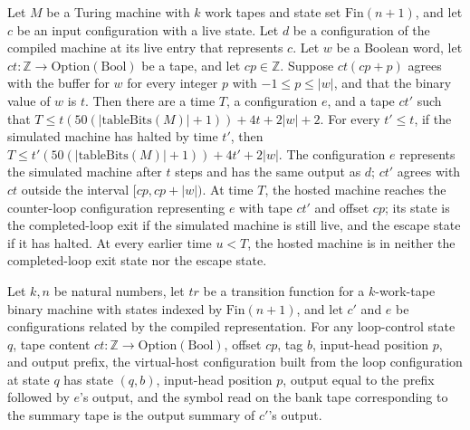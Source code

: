 \begin{theorem}
\label{Turing.StepBlock.hostedLoopTM_run}
\leanok
{}
Let $M$ be a Turing machine with $k$ work tapes and state set $\mathrm{Fin}(n+1)$, and
let $c$ be an input configuration with a live state. Let $d$ be a configuration of the
compiled machine at its live entry that represents $c$. Let $w$ be a Boolean word, let
$ct:\mathbb{Z}\to\mathrm{Option}(\mathrm{Bool})$ be a tape, and let $cp\in\mathbb{Z}$.
Suppose $ct(cp+p)$ agrees with the buffer for $w$ for every integer $p$ with
$-1\le p\le |w|$, and that the binary value of $w$ is $t$. Then there are a time $T$, a
configuration $e$, and a tape $ct\prime$ such that
$T\le t(50(|\mathrm{tableBits}(M)|+1))+4t+2|w|+2$. For every $t\prime\le t$, if the
simulated machine has halted by time $t\prime$, then
$T\le t\prime(50(|\mathrm{tableBits}(M)|+1))+4t\prime+2|w|$. The configuration $e$
represents the simulated machine after $t$ steps and has the same output as $d$; $ct\prime$
agrees with $ct$ outside the interval $[cp,cp+|w|)$. At time $T$, the hosted machine
reaches the counter-loop configuration representing $e$ with tape $ct\prime$ and offset
$cp$; its state is the completed-loop exit if the simulated machine is still live, and the
escape state if it has halted. At every earlier time $u<T$, the hosted machine is in
neither the completed-loop exit state nor the escape state.
\end{theorem}

\begin{theorem}
\label{Turing.StepBlock.hostedLoop_read}
\leanok
{}
Let $k,n$ be natural numbers, let $tr$ be a transition function for a $k$-work-tape
binary machine with states indexed by $\text{Fin}(n+1)$, and let $c'$ and $e$ be
configurations related by the compiled representation. For any loop-control state $q$,
tape content $ct:\mathbb{Z}\to\text{Option}(\text{Bool})$, offset $cp$, tag $b$, input-head
position $p$, and output prefix, the virtual-host configuration built from the loop
configuration at state $q$ has state $(q,b)$, input-head position $p$, output equal to
the prefix followed by $e$'s output, and the symbol read on the bank tape corresponding
to the summary tape is the output summary of $c'$'s output.
\end{theorem}
